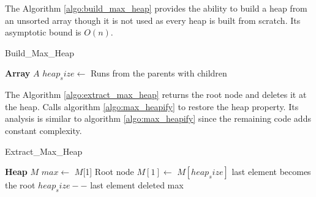 \documentclass[a4paper, 12pt, titlepage]{article}
\begin{document}
The Algorithm \ref{algo:build_max_heap} provides the ability to build a heap from an unsorted array though it is not used as every heap is built from scratch. Its asymptotic bound is \(O(n)\). 
\begin{algorithm}[]
	\caption{Build\_Max\_Heap}
	\label{algo:build_max_heap}
	\begin{algorithmic}
	\State \textbf{Array} $A$
        \State $heap_size \gets$ 
         \Comment Runs from the parents with children 
            \State {}
        \EndFor
	\EndFunction
	\end{algorithmic}
\end{algorithm}

The Algorithm \ref{algo:extract_max_heap} returns the root node and deletes it at the heap. Calls algorithm \ref{algo:max_heapify} to restore the heap property. Its analysis is similar to algorithm \ref{algo:max_heapify} since the remaining code adds constant complexity.

\begin{algorithm}[]
	\caption{Extract\_Max\_Heap}
	\label{algo:extract_max_heap}
	\begin{algorithmic}
	\State \textbf{Heap} $M$
	\Function{Extract\_Max\_Heap}{$A$}
        \State $max \gets$ $M$[1] \Comment Root node
        \State $M[1] \gets$ $M[heap_size]$ \Comment last element becomes the root
        \State $heap_size--$
        \State {} \Comment last element deleted
        \State {}
        \Return max
	\EndFunction
	\end{algorithmic}
\end{algorithm}
\end{document}
